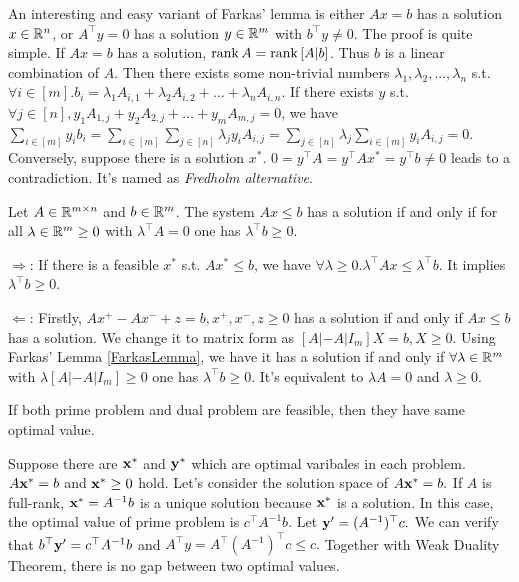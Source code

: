 \documentclass[12pt]{article}
\begin{document}
An interesting and easy variant of Farkas' lemma is either $Ax = b$ has a solution $x \in \mathbb{R}^n$, or $A^\top y = 0$ has a solution $y \in \mathbb{R}^m$ with $b^\top y \neq 0$. The proof is quite simple. If $Ax = b$ has a solution, $\operatorname{rank}{A} = \operatorname{rank}{[A|b]}$. Thus $b$ is a linear combination of $A$. Then there exists some non-trivial numbers $\lambda_1, \lambda_2,..., \lambda_n$ s.t. $\forall i \in [m]. b_i = \lambda_1 A_{i,1} + \lambda_2 A_{i,2} + \dots + \lambda_n A_{i,n}$. If there exists $y$ s.t. $\forall j\in [n], y_1A_{1,j} + y_2A_{2,j} + \dots + y_mA_{m,j} = 0$, we have $\sum_{i \in [m]} y_ib_i = \sum_{i \in [m]} \sum_{j \in [n]} \lambda_jy_iA_{i,j} = \sum_{j \in [n]} \lambda_j \sum_{i \in [m]} y_iA_{i,j} = 0$. Conversely, suppose there is a solution $x^*$. $0 = y^\top A = y^\top Ax^* = y^\top b \neq 0$ leads to a contradiction. It's named as \emph{Fredholm alternative}.


\begin{Lemma}
  Let $A \in \mathbb{R}^{m\times n}$ and $b \in \mathbb{R}^m$. The system $Ax \leq b$ has a solution if and only if for all $\lambda \in \mathbb{R}^m \geq 0$ with $\lambda^\top A = 0$ one has $\lambda^\top b \geq 0$.
\end{Lemma}
\begin{Proof}
  $\Rightarrow$: If there is a feasible $x^*$ s.t. $Ax^* \leq b$, we have $\forall \lambda \geq 0. \lambda^\top Ax \leq \lambda^\top b$. It implies $\lambda^\top b \geq 0$.
  
  $\Leftarrow$: Firstly, $Ax^+ - Ax^- + z = b, x^+,x^-,z \geq 0$ has a solution if and only if $Ax \leq b$ has a solution. We change it to matrix form as $[A|-A|I_m]X=b, X \geq 0$. Using Farkas' Lemma \eqref{FarkasLemma}, we have it has a solution if and only if $\forall \lambda \in \mathbb{R}^m$ with $\lambda[A|-A|I_m] \geq 0$ one has $\lambda^\top b \geq 0$. It's equivalent to $\lambda A = 0$ and $\lambda \geq 0$.
\end{Proof}

\begin{Theorem}
  If both prime problem and dual problem are feasible, then they have same optimal value.
\end{Theorem}

Suppose there are $\mathbf{x}^*$ and $\mathbf{y}^*$ which are optimal varibales in each problem. $A\mathbf{x}^* = b$ and $\mathbf{x}^* \geq 0$ hold. Let's consider the solution space of $A \mathbf{x}^* = b.$ If $A$ is full-rank, $\mathbf{x}^* = A^{-1}b$ is a unique solution because $\mathbf{x}^*$ is a solution. In this case, the optimal value of prime problem is $c^\top A^{-1} b$. Let $\mathbf{y}' = (A^{-1})^\top c.$ We can verify that $b^\top\mathbf{y}' = c^\top A^{-1} b$ and $A^\top y = A^\top (A^{-1})^\top c \leq c.$ Together with Weak Duality Theorem, there is no gap between two optimal values.
\end{document}
